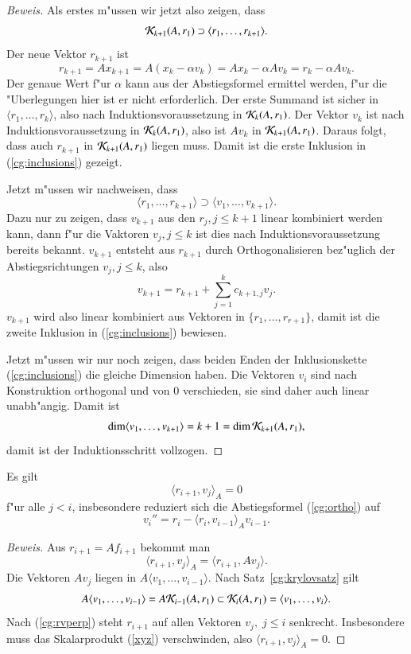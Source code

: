 {\begin{proof}[Beweis]
Als erstes m"ussen wir jetzt also zeigen, dass
\[
{\cal K}_{k+1}(A,r_1)
\supset
\langle r_1,\dots,r_{k+1}\rangle.
\]
Der neue Vektor $r_{k+1}$ ist 
\[
r_{k+1}=Ax_{k+1} = A(x_k-\alpha v_k)=Ax_k -\alpha Av_k=r_k-\alpha Av_k.
\]
Der genaue Wert f"ur $\alpha$ kann aus der Abstiegsformel ermittel werden,
f"ur die "Uberlegungen hier ist er nicht erforderlich.
Der erste Summand ist sicher in $\langle r_1,\dots,r_k\rangle$, also
nach Induktionsvoraussetzung in ${\cal K}_k(A,r_1)$.
Der Vektor $v_k$ ist nach Induktionsvoraussetzung in ${\cal K}_k(A,r_1)$,
also ist $Av_k$ in ${\cal K}_{k+1}(A,r_1)$.
Daraus folgt, dass auch $r_{k+1}$ in ${\cal K}_{k+1}(A,r_1)$ liegen muss.
Damit ist die erste Inklusion in (\ref{cg:inclusions}) gezeigt.

Jetzt m"ussen wir nachweisen, dass
\[
\langle r_1,\dots,r_{k+1}\rangle
\supset 
\langle v_1,\dots,v_{k+1}\rangle.
\]
Dazu nur zu zeigen, dass $v_{k+1}$
aus den $r_j,j\le k+1$ linear kombiniert werden kann, dann f"ur
die Vaktoren $v_j,j\le k$ ist dies nach Induktionsvoraussetzung
bereits bekannt. $v_{k+1}$ entsteht aus $r_{k+1}$ durch 
Orthogonalisieren bez"uglich der Abstiegsrichtungen $v_j,j\le k$,
also
\[
v_{k+1}=r_{k+1} + \sum_{j=1}^k c_{k+1,j}v_j.
\]
$v_{k+1}$ wird also linear kombiniert aus Vektoren in
$\{ r_1,\dots,r_{r+1}\}$, damit ist die zweite Inklusion in
(\ref{cg:inclusions}) bewiesen.

Jetzt m"ussen wir nur noch zeigen, dass beiden Enden der Inklusionskette
(\ref{cg:inclusions}) die gleiche Dimension haben.
Die Vektoren $v_i$ sind nach Konstruktion orthogonal und von $0$ verschieden,
sie sind daher auch linear unabh"angig. Damit ist 
\[
\dim\langle v_1,\dots,v_{k+1}\rangle=k+1=\dim{\cal K}_{k+1}(A,r_1),
\]
damit ist der Induktionsschritt vollzogen.
\end{proof}

\begin{satz}
\label{cg:orthogonality}
Es gilt
\[
\langle r_{i+1}, v_j \rangle_A = 0
\]
f"ur alle $j<i$, insbesondere reduziert sich die Abstiegsformel (\ref{cg:ortho})
auf
\[
v_i'' = r_i - \langle r_i, v_{i-1}\rangle_A v_{i-1}.
\]
\end{satz}

\begin{proof}[Beweis]
Aus
$r_{i+1}=Af_{i+1}$
bekommt man
\begin{equation}
\langle r_{i+1},v_j\rangle_A
=
\langle r_{i+1},Av_j\rangle.
\label{xyz}
\end{equation}
Die Vektoren $Av_j$ liegen in
$A\langle v_1,\dots,v_{i-1}\rangle$.
Nach Satz~\ref{cg:krylovsatz} gilt
\[
A\langle v_1,\dots,v_{i-1}\rangle = A{\cal K}_{i-1}(A,r_1)
\subset {\cal K}_i(A,r_1)
=\langle v_1,\dots,v_i\rangle.
\]
Nach (\ref{cg:rvperp}) steht $r_{i+1}$ auf allen Vektoren $v_j,\; j \le i$
senkrecht. Insbesondere muss das Skalarprodukt (\ref{xyz}) verschwinden,
also 
$\langle r_{i+1},v_j\rangle_A=0$.
\end{proof}
}

